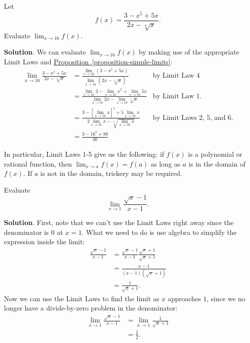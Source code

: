 \documentclass[10pt,]{book}
\theoremstyle{ptxplainnotitle}
\theoremstyle{ptxplaintitle}
\theoremstyle{ptxplainnotitle}
\theoremstyle{ptxplaintitle}
\theoremstyle{ptxplainnotitle}
\theoremstyle{ptxplaintitle}
\theoremstyle{ptxdefinitionnotitle}
\theoremstyle{ptxdefinitiontitle}
\theoremstyle{ptxdefinitionnotitle}
\theoremstyle{ptxdefinitiontitle}
\theoremstyle{ptxdefinitionnotitle}
\theoremstyle{ptxdefinitiontitle}
\theoremstyle{ptxdefinitionnotitle}
\theoremstyle{ptxdefinitiontitle}
\theoremstyle{ptxdefinitionnotitle}
\theoremstyle{ptxdefinitiontitle}
\numberwithin{equation}{section}
\begin{document}
\begin{example}\label{example-limit-of-a-rational-function}
\hypertarget{p-25}{}%
Let%
\begin{equation*}
f(x) = \frac{3 - x^{5} + 5x}{2x-\sqrt[4]{x}}.
\end{equation*}
Evaluate \(\lim_{x\to 16}f(x)\).%
\par\smallskip%
\noindent\textbf{Solution}.\hypertarget{solution-4}{}\quad%
\hypertarget{p-26}{}%
We can evaluate \(\lim_{x\to 16}f(x)\) by making use of the appropriate Limit Laws and \hyperref[proposition-simple-limits]{Proposition~\ref{proposition-simple-limits}}:%
%
\begin{align*}
\lim_{x\to 16}\frac{3 - x^{5} + 5x}{2x-\sqrt[4]{x}} & = \frac{\lim_{x\to 16}(3 - x^{5} + 5x)}{\lim_{x\to 16}(2x-\sqrt[4]{x})} & \text{by Limit Law 4}\\
& = \frac{\lim_{x\to 16}3 - \lim_{x\to 16}x^{5} + \lim_{x\to 16}5x}{\lim_{x\to 16}2x-\lim_{x\to 16}\sqrt[4]{x}} & \text{by Limit Law 1.} \\
& = \frac{3 - [\lim_{x\to 16}x]^{5} + 5\lim_{x\to 16}x}{2\lim_{x\to 16}x-\sqrt[4]{\lim_{x\to 16}x}} & \text{by Limit Laws 2, 5, and 6.} \\
& = \frac{3-16^{5}+80}{30} &
\end{align*}
\end{example}
\hypertarget{p-27}{}%
In particular, Limit Laws 1-5 give us the following: if \(f(x)\) is a polynomial or rational function, then \(\lim_{x\to a}f(x) = f(a)\) as long as \(a\) is in the domain of \(f(x)\). If \(a\) is not in the domain, trickery may be required.%
\begin{example}[{Trickery.}]\label{example-trickery}
\hypertarget{p-28}{}%
Evaluate%
\begin{equation*}
\lim_{x\to1}\frac{\sqrt{x}-1}{x-1}.
\end{equation*}
%
\par\smallskip%
\noindent\textbf{Solution}.\hypertarget{solution-5}{}\quad%
\hypertarget{p-29}{}%
First, note that we can't use the Limit Laws right away since the denominator is \(0\) at \(x=1\). What we need to do is use algebra to simplify the expression inside the limit:%
%
\begin{align*}
\frac{\sqrt{x}-1}{x-1} & = \frac{\sqrt{x}-1}{x-1}\frac{\sqrt{x}+1}{\sqrt{x}+1} \\
& = \frac{x - 1}{(x-1)(\sqrt{x}+1)} \\
& = \frac{1}{\sqrt{x}+1}. 
\end{align*}
\hypertarget{p-30}{}%
Now we can use the Limit Laws to find the limit as \(x\) approaches \(1\), since we no longer have a divide-by-zero problem in the denominator:%
%
\begin{align*}
\lim_{x\to1}\frac{\sqrt{x}-1}{x-1} & = \lim_{x\to1}\frac{1}{\sqrt{x}+1} \\
& = \frac{1}{2}. 
\end{align*}
\end{example}
\typeout{************************************************}
\typeout{************************************************}
\end{document}
